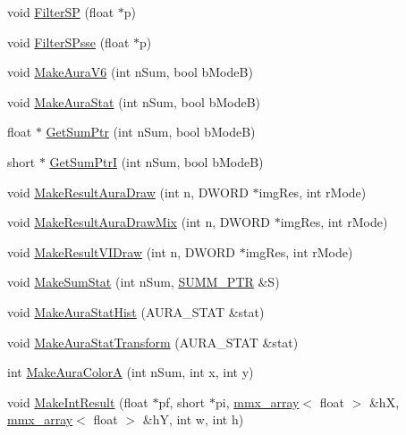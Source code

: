 \begin{DoxyCompactItemize}
\item 
void \hyperlink{class_c_v_i_engine_thread_a7e13a627c4b748b2a897e5cfb314f0a2}{Filter\+S\+P} (float $\ast$p)
\item 
void \hyperlink{class_c_v_i_engine_thread_a900848dc88ad3445296cbd72c467875c}{Filter\+S\+Psse} (float $\ast$p)
\item 
void \hyperlink{class_c_v_i_engine_thread_a138c31012cd6924325231acdd4fbba49}{Make\+Aura\+V6} (int n\+Sum, bool b\+Mode\+B)
\item 
void \hyperlink{class_c_v_i_engine_thread_a6194597cfb410aaa4a3b291f9dbe13cd}{Make\+Aura\+Stat} (int n\+Sum, bool b\+Mode\+B)
\item 
float $\ast$ \hyperlink{class_c_v_i_engine_thread_a157eaab33c9c5c2a157b458a4a0eb1f4}{Get\+Sum\+Ptr} (int n\+Sum, bool b\+Mode\+B)
\item 
short $\ast$ \hyperlink{class_c_v_i_engine_thread_ac9185cf585d0d141ccd42b7891020776}{Get\+Sum\+Ptr\+I} (int n\+Sum, bool b\+Mode\+B)
\item 
void \hyperlink{class_c_v_i_engine_thread_ae6cccc248ff3e63ee357ec6453f2ce4b}{Make\+Result\+Aura\+Draw} (int n, D\+W\+O\+R\+D $\ast$img\+Res, int r\+Mode)
\item 
void \hyperlink{class_c_v_i_engine_thread_a61e44ad37880d66e07855e751b67d9d3}{Make\+Result\+Aura\+Draw\+Mix} (int n, D\+W\+O\+R\+D $\ast$img\+Res, int r\+Mode)
\item 
void \hyperlink{class_c_v_i_engine_thread_abf2a40038d465ccb943072431774c6ae}{Make\+Result\+V\+I\+Draw} (int n, D\+W\+O\+R\+D $\ast$img\+Res, int r\+Mode)
\item 
void \hyperlink{class_c_v_i_engine_thread_a6e69080c6da14f8bb61c0615180bd088}{Make\+Sum\+Stat} (int n\+Sum, \hyperlink{struct_c_v_i_engine_thread_1_1tag_s_u_m_m___p_t_r}{S\+U\+M\+M\+\_\+\+P\+T\+R} \&S)
\item 
void \hyperlink{class_c_v_i_engine_thread_ac5a7ba8ea2d72478af174b471d73fd5c}{Make\+Aura\+Stat\+Hist} (A\+U\+R\+A\+\_\+\+S\+T\+A\+T \&stat)
\item 
void \hyperlink{class_c_v_i_engine_thread_a83784b07cdfcd4f006fbfa41aacd4d86}{Make\+Aura\+Stat\+Transform} (A\+U\+R\+A\+\_\+\+S\+T\+A\+T \&stat)
\item 
int \hyperlink{class_c_v_i_engine_thread_a5c5e1e4c1a32d38b39af4547ed4b5827}{Make\+Aura\+Color\+A} (int n\+Sum, int x, int y)
\item 
void \hyperlink{class_c_v_i_engine_thread_a77e3066544a8804d4cc5250ac9f4c54b}{Make\+Int\+Result} (float $\ast$pf, short $\ast$pi, \hyperlink{classmmx__array}{mmx\+\_\+array}$<$ float $>$ \&h\+X, \hyperlink{classmmx__array}{mmx\+\_\+array}$<$ float $>$ \&h\+Y, int w, int h)
\end{DoxyCompactItemize}
